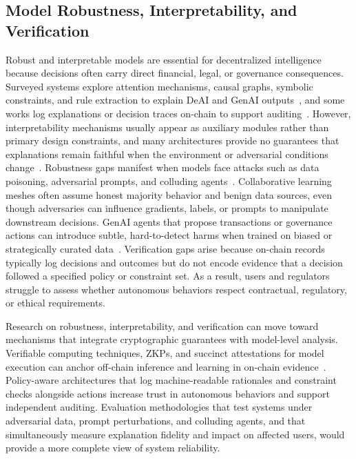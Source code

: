\documentclass[5p,twocolumn]{elsarticle}
\begin{document}
\subsection{Model Robustness, Interpretability, and Verification}
Robust and interpretable models are essential for decentralized intelligence because decisions often carry direct financial, legal, or governance consequences. Surveyed systems explore attention mechanisms, causal graphs, symbolic constraints, and rule extraction to explain DeAI and GenAI outputs~\cite{huang2024large}, and some works log explanations or decision traces on-chain to support auditing~\cite{costa2023show,niu2021review}. However, interpretability mechanisms usually appear as auxiliary modules rather than primary design constraints, and many architectures provide no guarantees that explanations remain faithful when the environment or adversarial conditions change~\cite{cheng2024survey,dwivedi2023explainable}. Robustness gaps manifest when models face attacks such as data poisoning, adversarial prompts, and colluding agents~\cite{luo2024survey,javadpour2024decentralized}. Collaborative learning meshes often assume honest majority behavior and benign data sources, even though adversaries can influence gradients, labels, or prompts to manipulate downstream decisions. GenAI agents that propose transactions or governance actions can introduce subtle, hard-to-detect harms when trained on biased or strategically curated data~\cite{kim2024large}. Verification gaps arise because on-chain records typically log decisions and outcomes but do not encode evidence that a decision followed a specified policy or constraint set. As a result, users and regulators struggle to assess whether autonomous behaviors respect contractual, regulatory, or ethical requirements.

Research on robustness, interpretability, and verification can move toward mechanisms that integrate cryptographic guarantees with model-level analysis. Verifiable computing techniques, ZKPs, and succinct attestations for model execution can anchor off-chain inference and learning in on-chain evidence~\cite{huang2023overview}. Policy-aware architectures that log machine-readable rationales and constraint checks alongside actions increase trust in autonomous behaviors and support independent auditing. Evaluation methodologies that test systems under adversarial data, prompt perturbations, and colluding agents, and that simultaneously measure explanation fidelity and impact on affected users, would provide a more complete view of system reliability.
\end{document}
